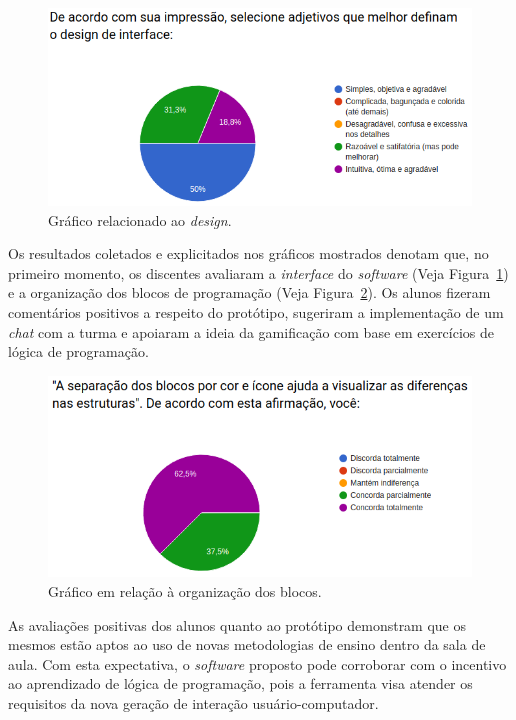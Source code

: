 \documentclass[12pt]{article}
\begin{document}
	\begin{figure}[!htbp]
		\centering
		\includegraphics[scale=0.5]{g1.png}
		\caption{Gráfico relacionado ao \textit{design}.}
		\label{fig3}
	\end{figure}
\par Os resultados coletados e explicitados nos gráficos mostrados denotam que, no primeiro momento, os discentes avaliaram a \textit{interface} do \textit{software} (Veja Figura~\ref{fig3}) e a organização dos blocos de programação (Veja Figura~\ref{fig4}). Os alunos fizeram comentários positivos a respeito do protótipo, sugeriram a implementação de um \textit{chat} com a turma e apoiaram a ideia da gamificação com base em exercícios de lógica de programação.
	\begin{figure}[!htbp]
		\centering
		\includegraphics[scale=0.5]{g2.png}
		\caption{Gráfico em relação à organização dos blocos.}
		\label{fig4}
	\end{figure} 
\par As avaliações positivas dos alunos quanto ao protótipo demonstram que os mesmos estão aptos ao uso de novas metodologias de ensino dentro da sala de aula. Com esta expectativa, o \textit{software} proposto pode corroborar com o incentivo ao aprendizado de lógica de programação, pois a ferramenta visa atender os requisitos da nova geração de interação usuário-computador. 	
\end{document}
